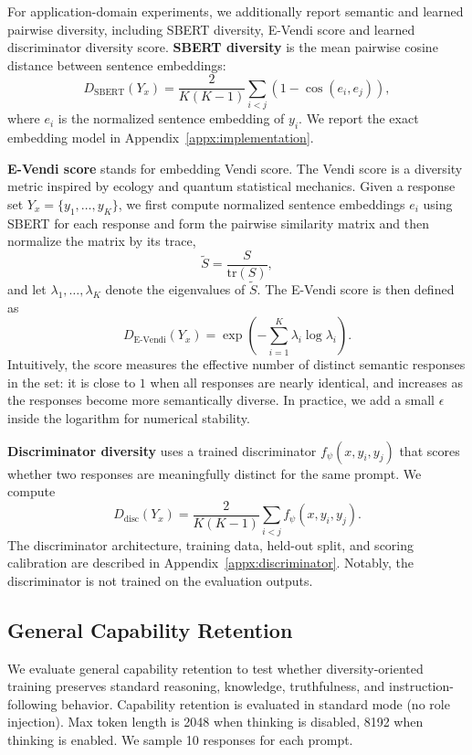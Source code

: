 For application-domain experiments, we additionally report semantic and
learned pairwise diversity, including SBERT diversity, E-Vendi score and learned discriminator diversity score. \textbf{SBERT diversity}\citep{reimers2019sentencebertsentenceembeddingsusing} is the mean pairwise
cosine distance between sentence embeddings:
\[
D_{\mathrm{SBERT}}(Y_x)
=
\frac{2}{K(K-1)}
\sum_{i<j}
\left(1-\cos(e_i,e_j)\right),
\]
where \(e_i\) is the normalized sentence embedding of \(y_i\). We report
the exact embedding model in Appendix~\ref{appx:implementation}.

\textbf{E-Vendi score} stands for embedding Vendi score. The Vendi score is a diversity metric inspired by ecology and quantum statistical mechanics. Given a response set \(Y_x=\{y_1,\ldots,y_K\}\), we
first compute normalized sentence embeddings \(e_i\) using SBERT for each response and form
the pairwise similarity matrix and then normalize the matrix by its trace,
\[
\tilde{S} = \frac{S}{\mathrm{tr}(S)},
\]
and let \(\lambda_1,\ldots,\lambda_K\) denote the eigenvalues of \(\tilde{S}\).
The E-Vendi score is then defined as
\[
D_{\mathrm{E\text{-}Vendi}}(Y_x)
=
\exp\left(
-\sum_{i=1}^{K} \lambda_i \log \lambda_i
\right).
\]
Intuitively, the score measures the effective number of distinct semantic
responses in the set: it is close to \(1\) when all responses are nearly
identical, and increases as the responses become more semantically diverse. In
practice, we add a small \(\epsilon\) inside the logarithm for numerical
stability.

\textbf{Discriminator diversity} uses a trained discriminator
\(f_\psi(x,y_i,y_j)\) that scores whether two responses are meaningfully
distinct for the same prompt. We compute
\[
D_{\mathrm{disc}}(Y_x)
=
\frac{2}{K(K-1)}
\sum_{i<j}
f_\psi(x,y_i,y_j).
\]
The discriminator architecture, training data, held-out split, and scoring
calibration are described in Appendix~\ref{appx:discriminator}. Notably, the
discriminator is not trained on the evaluation outputs.


\subsection{General Capability Retention}
\label{appx:general capability}

We evaluate general capability retention to test whether diversity-oriented training preserves standard reasoning, knowledge, truthfulness, and instruction-following behavior. Capability retention is evaluated in standard mode (no role injection). Max token length is 2048 when thinking is disabled, 8192 when thinking is enabled. We sample 10 responses for each prompt.

